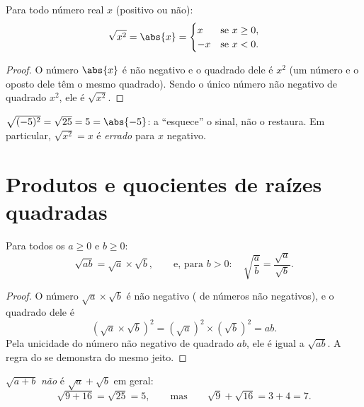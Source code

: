 \begin{proposition}\label{prop:g9:sqrt:square}
Para todo número real $x$ (positivo ou não):
\[
\sqrt{x^2} = \abs{x} =
\begin{cases}
x & \text{se } x \geq 0,\\
-x & \text{se } x < 0 .
\end{cases}
\]
\end{proposition}

\begin{proof}
O número $\abs{x}$ é não negativo e o quadrado dele é $x^2$ (um número
e o oposto dele têm o mesmo quadrado). Sendo o único número não
negativo de quadrado $x^2$, ele é $\sqrt{x^2}$.
\end{proof}

\begin{example}
$\sqrt{(-5)^2} = \sqrt{25} = 5 = \abs{-5}$: a 
``esquece'' o sinal, não o restaura. Em particular, $\sqrt{x^2} = x$ é
\emph{errado} para $x$ negativo.
\end{example}

\section{Produtos e quocientes de raízes quadradas}

\begin{theorem}\label{thm:g9:sqrt:rules}
Para todos os $a \geq 0$ e $b \geq 0$:
\[
\sqrt{a b} = \sqrt a \times \sqrt b,
\qquad\text{e, para } b > 0:\quad
\sqrt{\frac ab} = \frac{\sqrt a}{\sqrt b} .
\]
\end{theorem}

\begin{proof}
O número $\sqrt a \times \sqrt b$ é não negativo ( de números
não negativos), e o quadrado dele é
\[
\left(\sqrt a \times \sqrt b\right)^2
= \left(\sqrt a\right)^2 \times \left(\sqrt b\right)^2
= a b .
\]
Pela unicidade do número não negativo de quadrado $ab$, ele é igual a
$\sqrt{ab}$. A regra do  se demonstra do mesmo jeito.
\end{proof}

\begin{remark}
$\sqrt{a + b}$ \emph{não} é $\sqrt a + \sqrt b$ em geral:
\[
\sqrt{9 + 16} = \sqrt{25} = 5,
\qquad\text{mas}\qquad
\sqrt 9 + \sqrt{16} = 3 + 4 = 7 .
\]
\end{remark}

